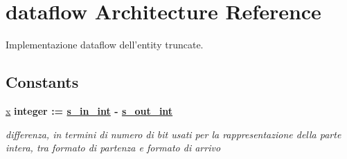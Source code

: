 \hypertarget{classtruncate_1_1dataflow}{\section{dataflow Architecture Reference}
\label{classtruncate_1_1dataflow}
}


Implementazione dataflow dell'entity truncate.  


\subsection*{Constants}
 \begin{DoxyCompactItemize}
\item 
\hyperlink{classtruncate_1_1dataflow_a63701d8af27da7452a7588efcff357bc}{x} {\bfseries \textcolor{vhdlchar}{integer}\textcolor{vhdlchar}{ }\textcolor{vhdlchar}{ }\textcolor{vhdlchar}{\+:}\textcolor{vhdlchar}{=}\textcolor{vhdlchar}{ }\textcolor{vhdlchar}{ }\textcolor{vhdlchar}{ }\textcolor{vhdlchar}{ }{\bfseries \hyperlink{classtruncate_abe72b503b8140ab0d84911165e959b53}{s\+\_\+in\+\_\+int}} \textcolor{vhdlchar}{-\/}\textcolor{vhdlchar}{ }\textcolor{vhdlchar}{ }\textcolor{vhdlchar}{ }{\bfseries \hyperlink{classtruncate_a4ca792ca981e2f9d82bf36d9c82c08af}{s\+\_\+out\+\_\+int}} \textcolor{vhdlchar}{ }} 
\begin{DoxyCompactList}\small\item\em differenza, in termini di numero di bit usati per la rappresentazione della parte intera, tra formato di partenza e formato di arrivo \end{DoxyCompactList}\end{DoxyCompactItemize}

